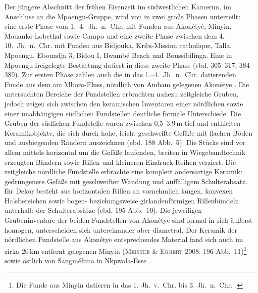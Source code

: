 Der jüngere Abschnitt der frühen Eisenzeit im südwestlichen Kamerun, im Anschluss an die Mpoengu-Gruppe, wird von \textcite[379f.]{GouemGouem.20102011} in zwei große Phasen unterteilt: eine erste Phase vom 1.--4.~Jh.~n.~Chr. mit Funden aus Akonétyé, Minyin, Mouanko-Lobethal sowie Campo und eine zweite Phase zwischen dem 4.--10.~Jh.~n.~Chr. mit Funden aus Bidjouka, Kribi-Mission catholique, Talla, Mpoengu, Eboundja 3, Bidou I, Bwambé Beach und Boussibilinga. Eine in Mpoengu freigelegte Bestattung datiert in diese zweite Phase (ebd. 305--317, 384--389). Zur ersten Phase zählen auch die in das 1.--4.~Jh.~n.~Chr. datierenden Funde aus dem am Mboro-Fluss, nördlich von Ambam gelegenen Akonétye \parencite[184]{Meister.2008b}. Die untersuchten Bereiche der Fundstellen erbrachten nahezu zeitgleiche Gruben, jedoch zeigen sich zwischen den keramischen Inventaren einer nördlichen sowie einer unabhängigen südlichen Fundstellen deutliche formale Unterschiede. Die Gruben der südlichen Fundstelle waren zwischen 0,5--3,9\,m tief und enthielten Keramikobjekte, die sich durch hohe, leicht geschweifte Gefäße mit flachen Böden und ausbiegenden Rändern auszeichnen (ebd. 188 Abb.~5). Die Stücke sind vor allem mittels horizontal um die Gefäße laufenden, breiten in Wiegebandtechnik erzeugten Bändern sowie Rillen und kleineren Eindruck-Reihen verziert. Die zeitgleiche nördliche Fundstelle erbrachte eine komplett andersartige Keramik: gedrungenere Gefäße mit geschweifter Wandung und auffälligem Schulterabsatz. Ihr Dekor besteht aus horizontalen Rillen an vornehmlich langen, konvexen Halsbereichen sowie bogen- beziehungsweise girlandenförmigen Rillenbündeln unterhalb der Schulterabsätze (ebd. 195 Abb.~10). Die jeweiligen Grubeninventare der beiden Fundstellen von Akonétye sind formal in sich äußerst homogen, unterscheiden sich untereinander aber diametral. Der Keramik der nördlichen Fundstelle aus Akonétye entsprechendes Material fand sich auch im zirka 20\,km entfernt gelegenen Minyin (\textsc{Meister \& Eggert} 2008: 196 Abb.~11)\footnote{Die Funde aus Minyin datieren in das 1. Jh.~v.~Chr. bis 3. Jh.~n.~Chr. \parencite[189 Tab.~1]{Meister.2008b}.} sowie östlich von Sangmélima in Nkpwala-Esse \parencite{Meyer.2008}.